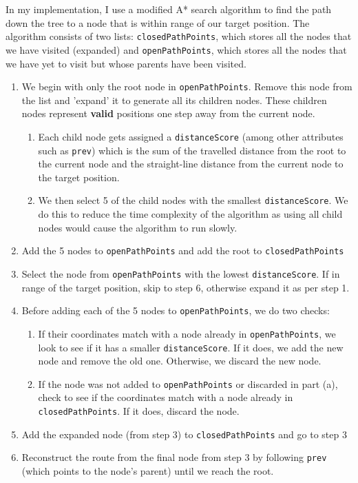 \documentclass[11pt]{article}
\begin{document}
In my implementation, I use a modified A* search algorithm to find the path down the tree to a node that is within range of our target position. The algorithm consists of two lists: \texttt{closedPathPoints}, which stores all the nodes that we have visited (expanded) and \texttt{openPathPoints}, which stores all the nodes that we have yet to visit but whose parents have been visited.
\begin{enumerate}[topsep=0pt, itemsep=0pt]
  \item We begin with only the root node in \texttt{openPathPoints}. Remove this node from the list and 'expand' it to generate all its children nodes. These children nodes represent \textbf{valid} positions one step away from the current node.
  \begin{enumerate}[topsep=0pt, itemsep=0pt]
      \item Each child node gets assigned a \texttt{distanceScore} (among other attributes such as \texttt{prev}) which is the sum of the travelled distance from the root to the current node and the straight-line distance from the current node to the target position.
      \item We then select 5 of the child nodes with the smallest \texttt{distanceScore}. We do this to reduce the time complexity of the algorithm as using all child nodes would cause the algorithm to run slowly.
  \end{enumerate}
  
  \item Add the 5 nodes to \texttt{openPathPoints} and add the root to \texttt{closedPathPoints}
  
  \item Select the node from \texttt{openPathPoints} with the lowest \texttt{distanceScore}. If in range of the target position, skip to step 6, otherwise expand it as per step 1.
  
  \item Before adding each of the 5 nodes to \texttt{openPathPoints}, we do two checks:
  \begin{enumerate}[topsep=0pt, itemsep=0pt]
      \item If their coordinates match with a node already in \texttt{openPathPoints}, we look to see if it has a smaller \texttt{distanceScore}. If it does, we add the new node and remove the old one. Otherwise, we discard the new node.
      \item If the node was not added to \texttt{openPathPoints} or discarded in part (a), check to see if the coordinates match with a node already in \texttt{closedPathPoints}. If it does, discard the node.      
    \end{enumerate}   
    
  \item Add the expanded node (from step 3) to \texttt{closedPathPoints} and go to step 3

  \item Reconstruct the route from the final node from step 3 by following \texttt{prev} (which points to the node's parent) until we reach the root.
\end{enumerate}
\end{document}
